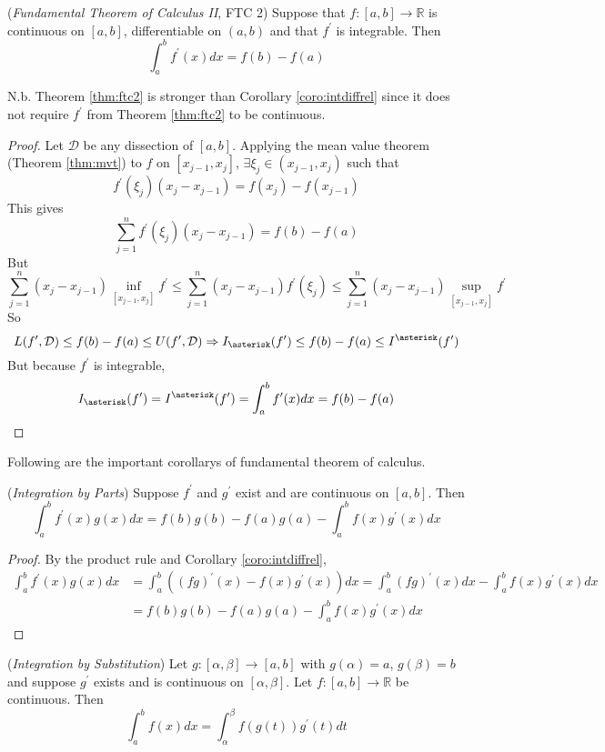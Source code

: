 \documentclass[10pt, a4paper, twoside]{report}
\begin{document}
\begin{theorem}
    (\emph{Fundamental Theorem of Calculus II}, FTC 2)
    Suppose that \(f:[a,b]\to\mathbb{R}\) is continuous on \([a,b]\), differentiable on \((a,b)\) and that \(f^\prime\) is integrable. Then
    \[\int_a^bf^\prime(x)dx=f(b)-f(a)\]
    \label{thm:ftc2}
\end{theorem}
N.b. Theorem \ref{thm:ftc2} is stronger than Corollary \ref{coro:intdiffrel} since it does not require \(f^\prime\) from Theorem \ref{thm:ftc2} to be continuous.
\begin{proof}
    Let \(\mathcal{D}\) be any dissection of \([a,b]\). Applying the mean value theorem (Theorem \ref{thm:mvt}) to \(f\) on \([x_{j-1},x_j]\), \(\exists\xi_j\in(x_{j-1},x_j)\) such that 
    \[f^\prime(\xi_j)(x_j-x_{j-1})=f(x_j)-f(x_{j-1})\]
    This gives
    \[\sum_{j=1}^{n}f^\prime(\xi_j)(x_j-x_{j-1})=f(b)-f(a)\]
    But 
    \[\sum_{j=1}^{n}(x_j-x_{j-1})\inf_{[x_{j-1},x_j]}f^\prime\leq\sum_{j=1}^{n}(x_j-x_{j-1})f^\prime(\xi_j)\leq \sum_{j=1}^{n}(x_j-x_{j-1})\sup_{[x_{j-1},x_j]}f^\prime\]
    So
    \[L(f^\prime,\mathcal{D})\leq f(b)-f(a)\leq U(f^\prime,\mathcal{D})\Rightarrow I_\asterisk(f^\prime)\leq f(b)-f(a)\leq I^\asterisk(f^\prime)\]
    But because \(f^\prime\) is integrable,
    \[I_\asterisk(f^\prime)=I^\asterisk(f^\prime)=\int_a^bf^\prime(x)dx=f(b)-f(a)\]
\end{proof}
Following are the important corollarys of fundamental theorem of calculus.
\begin{corollary}
    (\emph{Integration by Parts}) Suppose \(f^\prime\) and \(g^\prime\) exist and are continuous on \([a,b]\). Then
    \[\int_a^bf^\prime(x)g(x)dx=f(b)g(b)-f(a)g(a)-\int_a^bf(x)g^\prime(x)dx\]
\end{corollary}
\begin{proof}
    By the product rule and Corollary \ref{coro:intdiffrel}, 
    \begin{align*}
        \int_a^bf^\prime(x)g(x)dx&=\int_a^b((fg)^\prime(x)-f(x)g^\prime(x))dx=\int_a^b(fg)^\prime(x)dx-\int_a^bf(x)g^\prime(x)dx \\
        &=f(b)g(b)-f(a)g(a)-\int_a^bf(x)g^\prime(x)dx
    \end{align*}
\end{proof}
\begin{corollary}
    (\emph{Integration by Substitution}) Let \(g:[\alpha,\beta]\to[a,b]\) with \(g(\alpha)=a\), \(g(\beta)=b\) and suppose \(g^\prime\) exists and is continuous on \([\alpha,\beta]\). Let \(f:[a,b]\to\mathbb{R}\) be continuous. Then 
    \[\int_a^bf(x)dx=\int_\alpha^\beta f(g(t))g^\prime(t)dt\]
\end{corollary}
\end{document}
